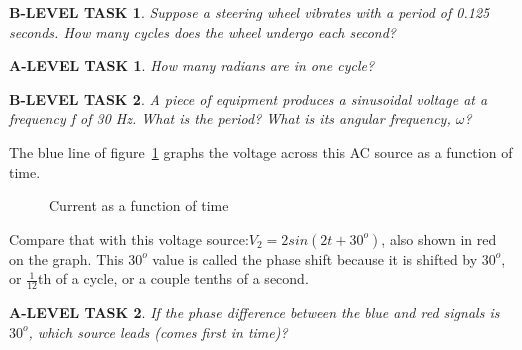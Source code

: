 \documentclass{book}
\numberwithin{equation}{section}
\newtheorem{alevel}{A-LEVEL TASK}
\newtheorem{blevel}{B-LEVEL TASK}
\theoremstyle{definition}
\begin{document}
\begin{blevel}
Suppose a steering wheel vibrates with a period of 0.125 seconds. How many cycles does the wheel undergo each second? 
\end{blevel}

\begin{alevel}
How many radians are in one cycle?
\end{alevel}

\begin{blevel}
A piece of equipment produces a sinusoidal voltage at a frequency f of 30 Hz. What is the period? What is its angular frequency, $\omega$?
\end{blevel}

The blue line of figure~\ref{F:8PHASE} graphs the voltage across this AC source as a function of time.

\begin{figure}[H]
\begin{center}
\caption{Current as a function of time}
\label{F:8PHASE}
\end{center}
\end{figure}

Compare that with this voltage source:$V_2=2sin(2t+30^o)$, also shown in red on the graph. This $30^o$ value is called the phase shift because it is shifted by $30^o$, or $\frac{1}{12}$th of a cycle, or a couple tenths of a second.

\begin{alevel}
If the phase difference between the blue and red signals is $30^o$, which source leads (comes first in time)?
\end{alevel}
\end{document}
